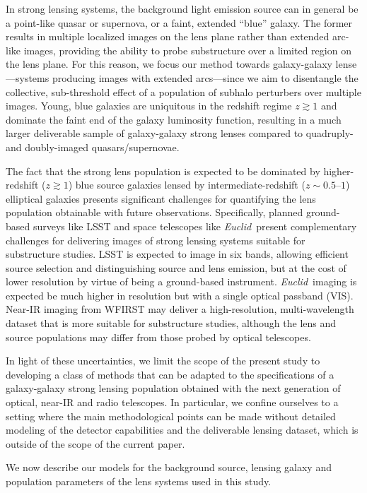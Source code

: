 \documentclass[twocolumn]{aastex62}
\newcommand{\Euclid}{\textsl{Euclid}}
\begin{document}
In strong lensing systems, the background light emission source can in general be a point-like quasar or supernova, or a faint, extended ``blue'' galaxy. The former results in multiple localized images on the lens plane rather than extended arc-like images, providing the ability to probe substructure over a limited region on the lens plane. For this reason, we focus our method towards galaxy-galaxy lense---systems producing images with extended arcs---since we aim to disentangle the collective, sub-threshold effect of a population of subhalo perturbers over multiple images. Young, blue galaxies are uniquitous in the redshift regime $z\gtrsim1$ and dominate the faint end of the galaxy luminosity function, resulting in a much larger deliverable sample of galaxy-galaxy strong lenses compared to quadruply- and doubly-imaged quasars/supernovae.

The fact that the strong lens population is expected to be dominated by higher-redshift ($z\gtrsim1$) blue source galaxies lensed by intermediate-redshift ($z\sim 0.5$--$1$) elliptical galaxies presents significant challenges for quantifying the lens population obtainable with future observations. Specifically, planned ground-based surveys like LSST and space telescopes like \Euclid~present complementary challenges for delivering images of strong lensing systems suitable for substructure studies. LSST is expected to image in six bands, allowing efficient source selection and distinguishing source and lens emission, but at the cost of lower resolution by virtue of being a ground-based instrument. \Euclid~imaging is expected be much higher in resolution but with a single optical passband (VIS). Near-IR imaging from WFIRST may deliver a high-resolution, multi-wavelength dataset that is more suitable for substructure studies, although the lens and source populations may differ from those probed by optical telescopes. 

In light of these uncertainties, we limit the scope of the present study to developing a class of methods that can be adapted to the specifications of a galaxy-galaxy strong lensing population obtained with the next generation of optical, near-IR and radio telescopes. In particular, we confine ourselves to a setting where the main methodological points can be made without detailed modeling of the detector capabilities and the deliverable lensing dataset, which is outside of the scope of the current paper.

We now describe our models for the background source, lensing galaxy and population parameters of the lens systems used in this study. 
\end{document}
